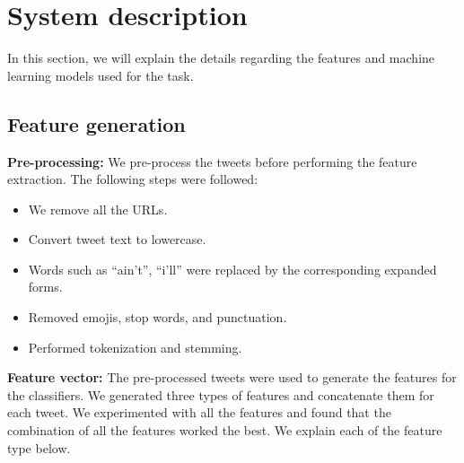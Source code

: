 \documentclass[11pt]{article}
\begin{document}
\section{System description}
In this section, we will explain the details regarding the features and machine learning models used for the task.

\subsection{Feature generation}
\noindent\textbf{Pre-processing: }
We pre-process the tweets before performing the feature extraction. The following steps were followed:

\begin{itemize}
    \item We remove all the URLs.
    
    \item Convert tweet text to lowercase.
    
    \item Words such as ``ain't'', ``i'll'' were replaced by the corresponding expanded forms.
    
    \item Removed emojis, stop words, and punctuation.
    
    \item Performed tokenization and stemming.
\end{itemize}




\noindent\textbf{Feature vector: }
The pre-processed tweets were used to generate the features for the classifiers. We generated three types of features and concatenate them for each tweet. We experimented with all the features and found that the combination of all the features worked the best.  We explain each of the feature type below. 
\end{document}
